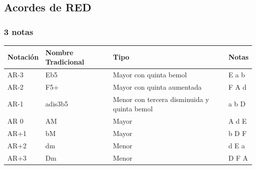 \documentclass[]{report}
\begin{document}
\subsection*{Acordes de RED}

\subsubsection*{3 notas}

\begin{table}[H]
	\centering
	\begin{tabularx}{\textwidth}{ll>{\raggedright\arraybackslash}Xl}
		\toprule
		Notación      & Nombre Tradicional & Tipo                                        & Notas \\
		\midrule
		\textsf{AR-3} & Eb5                & Mayor con quinta bemol                      & E a b \\
		\textsf{AR-2} & F5+                & Mayor con quinta aumentada                  & F A d \\
		\textsf{AR-1} & adis3b5            & Menor con tercera disminuida y quinta bemol & a b D \\
		\textsf{AR 0} & AM                 & Mayor                                       & A d E \\
		\textsf{AR+1} & bM                 & Mayor                                       & b D F \\
		\textsf{AR+2} & dm                 & Menor                                       & d E a \\
		\textsf{AR+3} & Dm                 & Menor                                       & D F A \\
		\bottomrule
	\end{tabularx}
\end{table}
\end{document}
